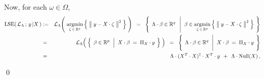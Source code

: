 Now, for each $\omega \in \Omega$,
\begin{eqnarray*}
\lse\!\left(\,\mathcal{L}_{\Lambda} \,;\, y\,\vert X\,\right)
&:=&
	\mathcal{L}_{\Lambda}\!\left(\;
		\underset{\zeta\,\in\,\Re^{p}}{\argmin}
		\left\{\;\left\Vert\;\overset{{\color{white}.}}{y} - X\cdot\zeta\;\right\Vert^{2}\;\right\}
		\;\right)
\;\; = \;\;
	\left\{\;\,
		\Lambda\cdot\beta \overset{{\color{white}.}}{\in} \Re^{q}
		\;\;\left\vert\;\;
		\beta \in \underset{\zeta\,\in\,\Re^{p}}{\argmin}
			\left\{\;\left\Vert\;\overset{{\color{white}.}}{y} - X\cdot\zeta\;\right\Vert^{2}\;\right\}
		\right.
		\;\right\}
\\
&=&
	\mathcal{L}_{\Lambda}\!\left(\;
		\left\{\;\,
			\beta \overset{{\color{white}.}}{\in} \Re^{p}
			\;\,\left\vert\;\;
			\overset{{\color{white}.}}{X} \cdot \beta \;=\; \Pi_{X} \cdot y
			\right.
			\;\right\}
		\;\right)
\;\; = \;\;
	\left\{\;\,
		\Lambda\cdot\beta \overset{{\color{white}.}}{\in} \Re^{q}
		\;\,\left\vert\;\;
		\overset{{\color{white}\vert}}{X} \cdot \beta \;=\; \Pi_{X} \cdot y
		\right.
		\;\right\}
\\
&=&
	\Lambda \cdot (X^{T} \cdot X)^{\dagger} \cdot X^{T} \cdot y \;\, + \;\, \Lambda \cdot \Null(X)\,,
\end{eqnarray*}

\qed

